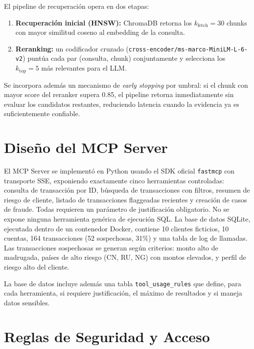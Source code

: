 \documentclass[conference]{IEEEtran}
\begin{document}
El pipeline de recuperación opera en dos etapas:

\begin{enumerate}
  \item \textbf{Recuperación inicial (HNSW):} ChromaDB retorna los \(k_{\text{fetch}} = 30\) chunks con mayor similitud coseno al embedding de la consulta.
  \item \textbf{Reranking:} un codificador cruzado (\texttt{cross-encoder/ms-marco-MiniLM-L-6-v2}) puntúa cada par (consulta, chunk) conjuntamente y selecciona los \(k_{\text{top}} = 5\) más relevantes para el LLM.
\end{enumerate}

Se incorpora además un mecanismo de \textit{early stopping} por umbral: si el chunk con mayor score del reranker supera 0.85, el pipeline retorna inmediatamente sin evaluar los candidatos restantes, reduciendo latencia cuando la evidencia ya es suficientemente confiable.

\section{Diseño del MCP Server}

El MCP Server se implementó en Python usando el SDK oficial \texttt{fastmcp} con transporte SSE, exponiendo exactamente cinco herramientas controladas: consulta de transacción por ID, búsqueda de transacciones con filtros, resumen de riesgo de cliente, listado de transacciones flaggeadas recientes y creación de casos de fraude. Todas requieren un parámetro de justificación obligatorio. No se expone ninguna herramienta genérica de ejecución SQL. La base de datos SQLite, ejecutada dentro de un contenedor Docker, contiene 10 clientes ficticios, 10 cuentas, 164 transacciones (52 sospechosas, 31\%) y una tabla de log de llamadas. Las transacciones sospechosas se generan según criterios: monto alto de madrugada, países de alto riesgo (CN, RU, NG) con montos elevados, y perfil de riesgo alto del cliente.

La base de datos incluye además una tabla \texttt{tool\_usage\_rules} que define, para cada herramienta, si requiere justificación, el máximo de resultados y si maneja datos sensibles.

\section{Reglas de Seguridad y Acceso}
\end{document}
